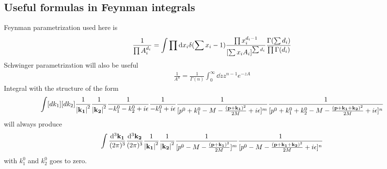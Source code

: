 \documentclass{article}
\begin{document}
\clearpage

\begin{appendices}
	\section{Useful formulas in Feynman integrals}
	Feynman parametrization used here is
	\begin{align}
		\frac{1}{\prod A_i^{d_i}}=\int\prod \dd x_i \delta(\sum x_i-1)\frac{\prod x_i^{d_i-1}}{\bqty{\sum x_iA_i}^{\sum d_i}}\frac{\Gamma(\sum d_i)}{\prod\Gamma(d_i)}
		\label{FEYNMANPARA}
	\end{align}
	Schwinger parametrization will also be useful
	\begin{align}
		\frac{1}{A^n}=\frac{1}{\Gamma{(n)}}\int_0^\infty\dd z z^{n-1}e^{-zA}
	\end{align}
	Integral with the structure of the form
	\begin{align*}
		\int[dk_1][dk_2]\frac{1}{\vb{\abs{k_1}}^2}\frac{1}{\vb{\abs{k_2}}^2}\frac{1}{-k_1^0-k_2^0+i\epsilon}\frac{1}{-k_1^0+i\epsilon}\frac{1}{[p^0+k_1^0-M-\frac{\vb{(p+k_1)}^2}{2M}+i\epsilon]^m}\frac{1}{[p^0+k_1^0+k_2^0-M-\frac{\vb{(p+k_1+k_2)}^2}{2M}+i\epsilon]^n}
	\end{align*}
	will always produce
	\begin{align*}
		\int\frac{\dd^3\vb{k_1}}{(2\pi)^3}\frac{\dd^3\vb{k_2}}{(2\pi)^3}\frac{1}{\vb{\abs{k_1}}^2}\frac{1}{\vb{\abs{k_2}}^2}\frac{1}{[p^0-M-\frac{\vb{(p+k_1)}^2}{2M}]^m}\frac{1}{[p^0-M-\frac{\vb{(p+k_1+k_2)}^2}{2M}+i\epsilon]^n}
	\end{align*}
	with $k_1^0$ and $k_2^0$ goes to zero.


\end{appendices}
\end{document}
